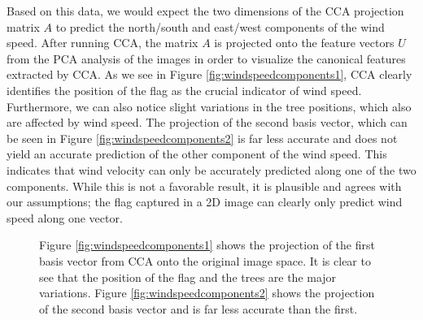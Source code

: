 Based on this data, we would expect the two dimensions of the CCA projection matrix $A$ to predict the north/south and east/west components of the wind speed. After running CCA, the matrix $A$ is projected onto the feature vectors $U$ from the PCA analysis of the images in order to visualize the canonical features extracted by CCA. As we see in Figure \ref{fig:windspeedcomponents1}, CCA clearly identifies the position of the flag as the crucial indicator of wind speed. Furthermore, we can also notice slight variations in the tree positions, which also are affected by wind speed. The projection of the second basis vector, which can be seen in Figure \ref{fig:windspeedcomponents2} is far less accurate and does not yield an accurate prediction of the other component of the wind speed. This indicates that wind velocity can only be accurately predicted along one of the two components. While this is not a favorable result, it is plausible and agrees with our assumptions; the flag captured in a 2D image can clearly only predict wind speed along one vector. 
\begin{figure}
	\centering
		\caption{Figure \ref{fig:windspeedcomponents1} shows the projection of the first basis vector from CCA onto the original image space. It is clear to see that the position of the flag and the trees are the major variations. Figure \ref{fig:windspeedcomponents2} shows the projection of the second basis vector and is far less accurate than the first.}
\end{figure}

